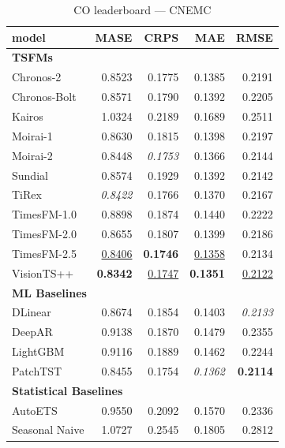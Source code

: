 \begin{table}[H]
\caption{CO leaderboard --- CNEMC}
\centering
\begin{small}
\begin{tabular}{lrrrr}
\toprule
model & MASE & CRPS & MAE & RMSE \\
\midrule
\multicolumn{5}{l}{\textbf{TSFMs}} \\
Chronos-2 & 0.8523 & 0.1775 & 0.1385 & 0.2191 \\
Chronos-Bolt & 0.8571 & 0.1790 & 0.1392 & 0.2205 \\
Kairos & 1.0324 & 0.2189 & 0.1689 & 0.2511 \\
Moirai-1 & 0.8630 & 0.1815 & 0.1398 & 0.2197 \\
Moirai-2 & 0.8448 & \textit{0.1753} & 0.1366 & 0.2144 \\
Sundial & 0.8574 & 0.1929 & 0.1392 & 0.2142 \\
TiRex & \textit{0.8422} & 0.1766 & 0.1370 & 0.2167 \\
TimesFM-1.0 & 0.8898 & 0.1874 & 0.1440 & 0.2222 \\
TimesFM-2.0 & 0.8655 & 0.1807 & 0.1399 & 0.2186 \\
TimesFM-2.5 & \underline{0.8406} & \textbf{0.1746} & \underline{0.1358} & 0.2134 \\
VisionTS++ & \textbf{0.8342} & \underline{0.1747} & \textbf{0.1351} & \underline{0.2122} \\
\midrule
\multicolumn{5}{l}{\textbf{ML Baselines}} \\
DLinear & 0.8674 & 0.1854 & 0.1403 & \textit{0.2133} \\
DeepAR & 0.9138 & 0.1870 & 0.1479 & 0.2355 \\
LightGBM & 0.9116 & 0.1889 & 0.1462 & 0.2244 \\
PatchTST & 0.8455 & 0.1754 & \textit{0.1362} & \textbf{0.2114} \\
\midrule
\multicolumn{5}{l}{\textbf{Statistical Baselines}} \\
AutoETS & 0.9550 & 0.2092 & 0.1570 & 0.2336 \\
Seasonal Naive & 1.0727 & 0.2545 & 0.1805 & 0.2812 \\
\bottomrule
\end{tabular}
\end{small}
\end{table}